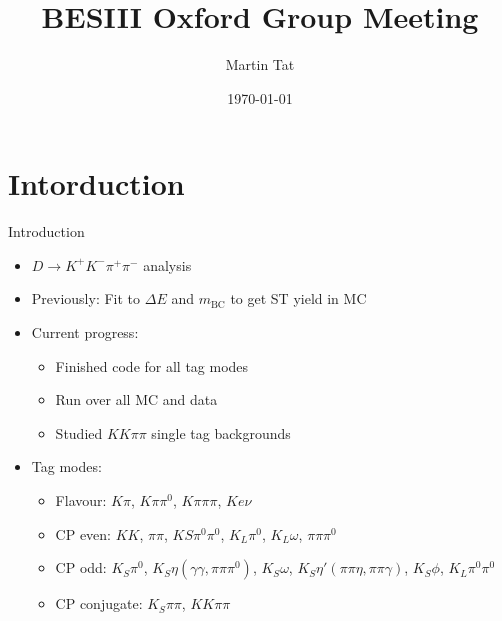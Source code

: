 \documentclass{beamer}
\title[BESIII Oxford]{BESIII Oxford Group Meeting}
\author{Martin Tat}
\institute{Oxford LHCb}
\date{\today}
\begin{document}
\begin{frame}
  \titlepage
\end{frame}


\section{Intorduction}
\begin{frame}{Introduction}
  \begin{itemize}
    \setlength\itemsep{2em}
    \item{$D\to K^+K^-\pi^+\pi^-$ analysis}
    \item{Previously: Fit to $\Delta E$ and $m_\text{BC}$ to get ST yield in MC}
    \item{Current progress:}
    \begin{itemize}
      \item{Finished code for all tag modes}
      \item{Run over all MC and data}
      \item{Studied $KK\pi\pi$ single tag backgrounds}
    \end{itemize}
    \item{Tag modes:}
    \begin{itemize}
      \item{Flavour: $K\pi$, $K\pi\pi^0$, $K\pi\pi\pi$, $Ke\nu$}
      \item{CP even: $KK$, $\pi\pi$, $KS\pi^0\pi^0$, $K_L\pi^0$, $K_L\omega$, $\pi\pi\pi^0$}
      \item{CP odd: $K_S\pi^0$, $K_S\eta(\gamma\gamma, \pi\pi\pi^0)$, $K_S\omega$, $K_S\eta'(\pi\pi\eta, \pi\pi\gamma)$, $K_S\phi$, $K_L\pi^0\pi^0$}
      \item{CP conjugate: $K_S\pi\pi$, $KK\pi\pi$}
    \end{itemize}
  \end{itemize}
\end{frame}
\end{document}
